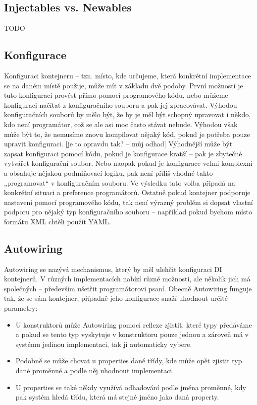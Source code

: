 \documentclass[a4paper,conference]{IEEEtran}
\begin{document}
\subsection{Injectables vs. Newables}

TODO

\subsection{Konfigurace}

Konfiguraci kontejneru – tzn. místo, kde určujeme, která konkrétní implementace se na daném místě použije, může mít v základu dvě podoby. První možností je tuto konfiguraci provést přímo pomocí programového kódu, nebo můžeme konfiguraci načítat z konfiguračního souboru a pak jej zpracovávat.
Výhodou konfiguračních souborů by mělo být, že by je měl být schopný upravovat i někdo, kdo není programátor, což se ale asi moc často stávat nebude. Výhodou však může být to, že nemusíme znovu kompilovat nějaký kód, pokud je potřeba pouze upravit konfiguraci. [je to opravdu tak? – můj odhad]
Výhodnější může být zapsat konfiguraci pomocí kódu, pokud je konfigurace kratší – pak je zbytečné vytvářet konfigurační soubor. Nebo naopak pokud je konfigurace velmi komplexní a obsahuje nějakou podmiňovací logiku, pak není příliš vhodné takto „programovat“ v konfiguračním souboru.
Ve výsledku tato volba připadá na konkrétní situaci a preference programátorů. Ostatně pokud kontejner podporuje nastavení pomocí programového kódu, tak není výrazný problém si dopsat vlastní podporu pro nějaký typ konfiguračního souboru – například pokud bychom místo formátu XML chtěli použít YAML.

\subsection{Autowiring}

Autowiring se nazývá mechanismus, který by měl ulehčit konfiguraci DI kontejnerů. V různých implementacích nabízí různé možnosti, ale několik jich má společných – především ušetřit programátorovi psaní. Obecně Autowiring funguje tak, že se sám kontejner, případně jeho konfigurace snaží uhodnout určité parametry:
\begin{itemize}
\item U konstruktorů může Autowiring pomocí reflexe zjistit, které typy předáváme a pokud se tento typ vyskytuje v konstruktoru pouze jednou a zároveň má v systému jedinou implementaci, tak ji automaticky vybere.
\item Podobně se může chovat u properties dané třídy, kde může opět zjistit typ dané proměnné a podle něj uhodnout implementaci.
\item U properties se také někdy využívá odhadování podle jména proměnné, kdy pak systém hledá třídu, která má stejné jméno jako daná property.
\end{itemize}
\end{document}

